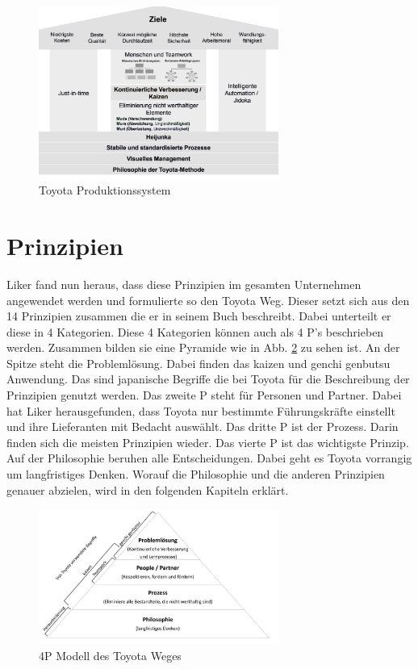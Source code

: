 \documentclass[a4paper,12pt]{scrartcl}
\begin{document}
\begin{figure}[h] 
  \centering
     \includegraphics[width=0.7\textwidth]{TPS.png}
  \caption{Toyota Produktionssystem}
  \label{TPS}
\end{figure}

\clearpage

\section{Prinzipien}

Liker fand nun heraus, dass diese Prinzipien im gesamten Unternehmen angewendet werden und formulierte so den Toyota Weg. Dieser setzt sich aus den 14 Prinzipien zusammen die er in seinem Buch beschreibt. Dabei unterteilt er diese in 4 Kategorien. Diese 4 Kategorien können auch als 4 P's beschrieben werden. Zusammen bilden sie eine Pyramide wie in Abb. \ref{4P} zu sehen ist. An der Spitze steht die Problemlösung. Dabei finden das kaizen und genchi genbutsu Anwendung. Das sind japanische Begriffe die bei Toyota für die Beschreibung der Prinzipien genutzt werden. Das zweite P steht für Personen und Partner. Dabei hat Liker herausgefunden, dass Toyota nur bestimmte Führungskräfte einstellt und ihre Lieferanten mit Bedacht auswählt. Das dritte P ist der Prozess. Darin finden sich die meisten Prinzipien wieder. Das vierte P ist das wichtigste Prinzip. Auf der Philosophie beruhen alle Entscheidungen. Dabei geht es Toyota vorrangig um langfristiges Denken. Worauf die Philosophie und die anderen Prinzipien genauer abzielen, wird in den folgenden Kapiteln erklärt.

\begin{figure}[h] 
  \centering
     \includegraphics[width=0.7\textwidth]{4P.jpg}
  \caption{4P Modell des Toyota Weges}
  \label{4P}
\end{figure}
\end{document}
